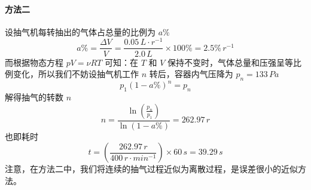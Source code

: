 \begin{solution}
    \paragraph{方法二} 设抽气机每转抽出的气体占总量的比例为 $a\%$
    $$
        a\% = \frac{\Delta V}{V}
        = \frac{
            0.05 \,\si{L \cdot r^{-1}}
        }{
            2.0 \,\si{L}
        } \times 100\%
        = 2.5\% \,\si{r^{-1}}
    $$
    而根据物态方程 $pV = \nu RT$ 可知：在 $T$ 和 $V$ 保持不变时，气体总量和压强呈等比例变化，所以我们不妨设抽气机工作 $n$ 转后，容器内气压降为 $p_n = 133 \,\si{Pa}$
    $$
        p_1 (1-a\%)^n = p_n
    $$
    解得抽气的转数 $n$
    $$
        n = \frac{\ln\left(\frac{p_n}{p_1}\right)}{\ln(1-a\%)}
        = 262.97 \,\si{r}
    $$
    也即耗时
    $$
        t = \left(\frac{262.97 \,\si{r}}{400 \,\si{r \cdot min^{-1}}}\right) \times 60 \,\si{s}
        = 39.29 \,\si{s}
    $$
    注意，在方法二中，我们将连续的抽气过程近似为离散过程，是误差很小的近似方法。
\end{solution}

